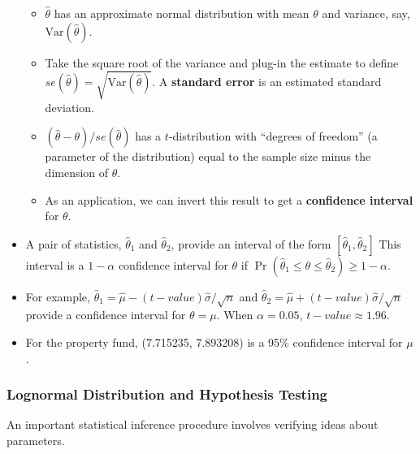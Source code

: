 \documentclass[]{book}
\begin{document}
\begin{itemize}
  \begin{itemize}
  \item
    \(\hat{\theta}\) has an approximate normal distribution with mean
    \(\theta\) and variance, say, \(\mathrm{Var}(\hat{\theta})\).
  \item
    Take the square root of the variance and plug-in the estimate to
    define \(se(\hat{\theta}) = \sqrt{\mathrm{Var}(\hat{\theta})}\). A
    \textbf{standard error} is an estimated standard deviation.
  \item
    \((\hat{\theta}-\theta)/se(\hat{\theta})\) has a \(t\)-distribution
    with ``degrees of freedom'' (a parameter of the distribution) equal
    to the sample size minus the dimension of \(\theta\).
  \item
    As an application, we can invert this result to get a
    \textbf{confidence interval} for \(\theta\).
  \end{itemize}
\item
  A pair of statistics, \(\hat{\theta}_1\) and \(\hat{\theta}_2\),
  provide an interval of the form \([\hat{\theta}_1, \hat{\theta}_2]\)
  This interval is a \(1-\alpha\) confidence interval for \(\theta\) if
  \(\Pr\left(\hat{\theta}_1 \le \theta \le \hat{\theta}_2\right) \ge 1-\alpha.\)
\item
  For example,
  \(\hat{\theta}_1 = \hat{\mu} - (t-value) \hat{\sigma}/\sqrt{n}\) and
  \(\hat{\theta}_2 = \hat{\mu} + (t-value) \hat{\sigma}/\sqrt{n}\)
  provide a confidence interval for \(\theta=\mu\). When
  \(\alpha = 0.05\), \(t-value \approx 1.96\).
\item
  For the property fund, (7.715235, 7.893208) is a 95\% confidence
  interval for \(\mu\).
\end{itemize}

\subsubsection{Lognormal Distribution and Hypothesis
Testing}\label{lognormal-distribution-and-hypothesis-testing}

An important statistical inference procedure involves verifying ideas
about parameters.
\end{document}
